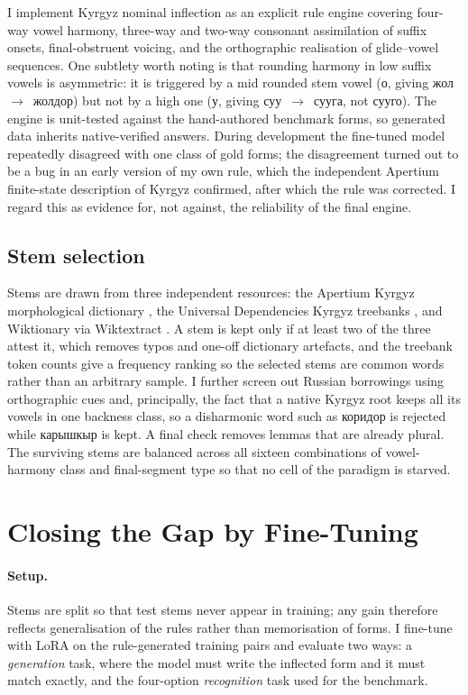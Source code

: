 \documentclass{article}
\newcommand{\ky}[1]{\foreignlanguage{russian}{#1}}
\begin{document}
I implement Kyrgyz nominal inflection as an explicit rule engine covering four-way
vowel harmony, three-way and two-way consonant assimilation of suffix onsets,
final-obstruent voicing, and the orthographic realisation of glide--vowel sequences.
One subtlety worth noting is that rounding harmony in low suffix vowels is asymmetric:
it is triggered by a mid rounded stem vowel (\ky{о}, giving \ky{жол}~$\to$~\ky{жолдор})
but not by a high one (\ky{у}, giving \ky{суу}~$\to$~\ky{сууга}, not \ky{сууго}). The
engine is unit-tested against the hand-authored benchmark forms, so generated data
inherits native-verified answers. During development the fine-tuned model repeatedly
disagreed with one class of gold forms; the disagreement turned out to be a bug in an
early version of my own rule, which the independent Apertium finite-state description
of Kyrgyz \cite{khanna2021apertium} confirmed, after which the rule was corrected. I
regard this as evidence for, not against, the reliability of the final engine.

\subsection{Stem selection}

Stems are drawn from three independent resources: the Apertium Kyrgyz morphological
dictionary \cite{khanna2021apertium}, the Universal Dependencies Kyrgyz treebanks
\cite{nivre2020ud}, and Wiktionary via Wiktextract \cite{ylonen2022wiktextract}. A
stem is kept only if at least two of the three attest it, which removes typos and one-off
dictionary artefacts, and the treebank token counts give a frequency ranking so the
selected stems are common words rather than an arbitrary sample. I further screen out
Russian borrowings using orthographic cues and, principally, the fact that a native
Kyrgyz root keeps all its vowels in one backness class, so a disharmonic word such as
\ky{коридор} is rejected while \ky{карышкыр} is kept. A final check removes lemmas that
are already plural. The surviving stems are balanced across all sixteen combinations of
vowel-harmony class and final-segment type so that no cell of the paradigm is starved.

\section{Closing the Gap by Fine-Tuning}
\label{sec:finetune}

\paragraph{Setup.} Stems are split so that test stems never appear in training; any
gain therefore reflects generalisation of the rules rather than memorisation of forms.
I fine-tune with LoRA \cite{hu2022lora} on the rule-generated training pairs and
evaluate two ways: a
\emph{generation} task, where the model must write the inflected form and it must match
exactly, and the four-option \emph{recognition} task used for the benchmark.
\end{document}
